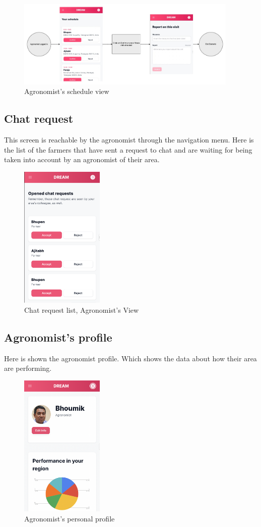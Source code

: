 \documentclass[10pt]{report}
\begin{document}
\begin{figure}[H]
    \centering
    \includegraphics[width=400px]{Mockups/MockUpDiagram-ScheduleAgronomist.jpg}
    \caption{Agronomist's schedule view}
\end{figure}

\subsection{Chat request}
This screen is reachable by the agronomist through the navigation menu. Here is the list of the farmers that have sent a request to chat and are waiting for being taken into account by an agronomist of their area.
\begin{figure}[H]
    \centering
    \includegraphics[width=150px]{Mockups/chatRequestAG.png}
    \caption{Chat request list, Agronomist's View}
\end{figure}

\subsection{Agronomist's profile}
Here is shown the agronomist profile. Which shows the data about how their area are performing. 
\begin{figure}[H]
    \centering
    \includegraphics[width=150px]{Mockups/personalProfileAG.png}
    \caption{Agronomist's personal profile}
\end{figure}
\end{document}
